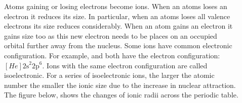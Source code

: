 \documentclass[main.tex]{subfiles}
\begin{document}
\begin{description}
  

\item[] 
Atoms gaining or losing electrons become ions. When an atoms loses an electron it reduces its size. In particular, when an atoms loses all valence electrons its size reduces considerably. When an atom gains an electron it gains size too as this new electron needs to be places on an occupied orbital further away from the nucleus.
Some ions have common electronic configuration. For example,  and   both have the electron configuration: $[He] \text{2s}^2 \text{2p}^6$. Ions with the same electron configuration are called isoelectronic. For a series of isoelectronic ions, the larger the atomic number the smaller the ionic size due to the increase in nuclear attraction. The figure below, shows the changes of ionic radii across the periodic table.


\end{description}
\end{document}

